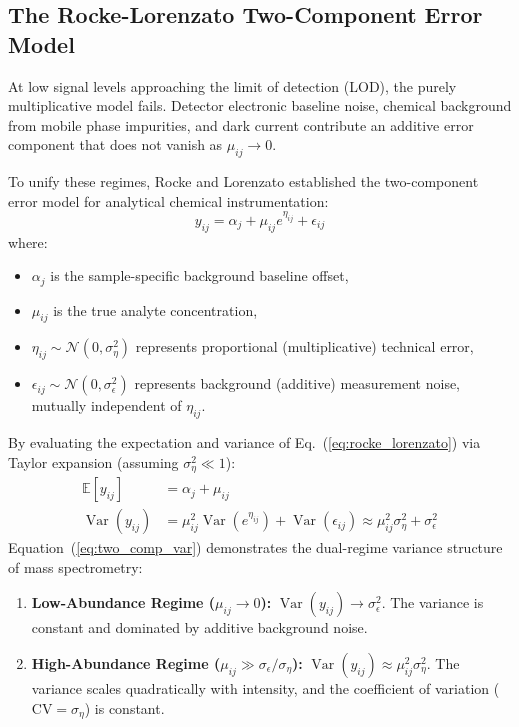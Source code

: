 \documentclass[11pt,oneside]{book}
\begin{document}
\subsection{The Rocke-Lorenzato Two-Component Error Model}

At low signal levels approaching the limit of detection (LOD), the purely multiplicative model fails. Detector electronic baseline noise, chemical background from mobile phase impurities, and dark current contribute an additive error component that does not vanish as $\mu_{ij} \to 0$.

To unify these regimes, Rocke and Lorenzato \cite{rocke1995two} established the two-component error model for analytical chemical instrumentation:
\begin{equation}
\label{eq:rocke_lorenzato}
y_{ij} = \alpha_j + \mu_{ij} e^{\eta_{ij}} + \epsilon_{ij}
\end{equation}
where:
\begin{itemize}
    \item $\alpha_j$ is the sample-specific background baseline offset,
    \item $\mu_{ij}$ is the true analyte concentration,
    \item $\eta_{ij} \sim \mathcal{N}(0, \sigma_\eta^2)$ represents proportional (multiplicative) technical error,
    \item $\epsilon_{ij} \sim \mathcal{N}(0, \sigma_\epsilon^2)$ represents background (additive) measurement noise, mutually independent of $\eta_{ij}$.
\end{itemize}

By evaluating the expectation and variance of Eq.~(\ref{eq:rocke_lorenzato}) via Taylor expansion (assuming $\sigma_\eta^2 \ll 1$):
\begin{align}
\mathbb{E}[y_{ij}] &= \alpha_j + \mu_{ij} \\
\operatorname{Var}(y_{ij}) &= \mu_{ij}^2 \operatorname{Var}(e^{\eta_{ij}}) + \operatorname{Var}(\epsilon_{ij}) \approx \mu_{ij}^2 \sigma_\eta^2 + \sigma_\epsilon^2
\label{eq:two_comp_var}
\end{align}
Equation~(\ref{eq:two_comp_var}) demonstrates the dual-regime variance structure of mass spectrometry:
\begin{enumerate}
    \item \textbf{Low-Abundance Regime ($\mu_{ij} \to 0$):} $\operatorname{Var}(y_{ij}) \to \sigma_\epsilon^2$. The variance is constant and dominated by additive background noise.
    \item \textbf{High-Abundance Regime ($\mu_{ij} \gg \sigma_\epsilon/\sigma_\eta$):} $\operatorname{Var}(y_{ij}) \approx \mu_{ij}^2 \sigma_\eta^2$. The variance scales quadratically with intensity, and the coefficient of variation ($\text{CV} = \sigma_\eta$) is constant.
\end{enumerate}
\end{document}
